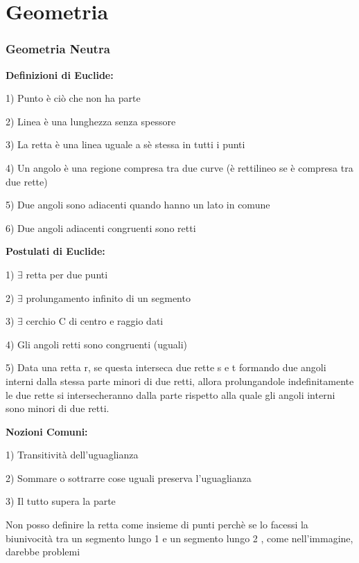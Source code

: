 \documentclass[a4paper,10pt]{article}
\theoremstyle{definition}
\theoremstyle{indentdefinition}
\theoremstyle{indentpostulate}
\theoremstyle{indenttheorem}
\theoremstyle{myremark}
\theoremstyle{indentgeneral}
\begin{document}
\pagebreak{}
\part{Geometria}
\section{Geometria Neutra}

\vspace{.5cm}

\textbf{Definizioni di Euclide:}

1) Punto è ciò che non ha parte

2) Linea è una lunghezza senza spessore

3) La retta è una linea uguale a sè stessa in tutti i punti

4) Un angolo è una regione compresa tra due curve (è rettilineo se è compresa tra due rette)

5) Due angoli sono adiacenti quando hanno un lato in comune

6) Due angoli adiacenti congruenti sono retti

\vspace{.5cm}

\textbf{Postulati di Euclide:}

1) $\exists$ retta per due punti

2) $\exists$ prolungamento infinito di un segmento

3) $\exists$ cerchio C di centro e raggio dati

4) Gli angoli retti sono congruenti (uguali)

5) Data una retta r, se questa interseca due rette s e t formando due angoli interni dalla stessa parte minori di due retti, allora prolungandole indefinitamente le due rette si intersecheranno dalla parte rispetto alla quale gli angoli interni sono minori di due retti. 

\vspace{.5cm}

\textbf{Nozioni Comuni:}

1) Transitività dell'uguaglianza

2) Sommare o sottrarre cose uguali preserva l'uguaglianza

3) Il tutto supera la parte

Non posso definire la retta come insieme di punti perchè se lo facessi la biunivocità tra un segmento lungo 1 e un segmento lungo 2 , come nell'immagine, darebbe problemi
\end{document}
